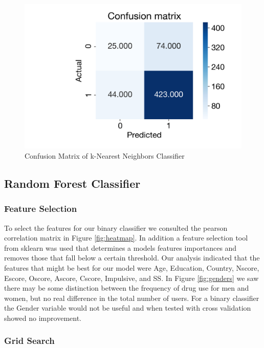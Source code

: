\documentclass[10pt]{article}
\begin{document}
\begin{figure}[H]
\caption{Confusion Matrix of k-Nearest Neighbors Classifier}
\label{fig:conf_matrix_knn}
\centering
\includegraphics[scale=0.4]{conf_matrix_knn.png}
\end{figure}

\subsection*{Random Forest Classifier}


\subsubsection*{Feature Selection}

To select the features for our binary classifier we consulted the pearson correlation matrix in Figure \ref{fig:heatmap}. In addition a feature selection tool from sklearn was used that determines a models features importances and removes those that fall below a certain threshold. Our analysis indicated that the features that might be best for our model were Age, Education, Country, Nscore, Escore, Oscore, Ascore, Cscore, Impulsive, and SS. In Figure \ref{fig:genders} we saw there may be some distinction between the frequency of drug use for men and women, but no real difference in the total number of users. For a binary classifier the Gender variable would not be useful and when tested with cross validation showed no improvement.

\subsubsection*{Grid Search}
\end{document}
